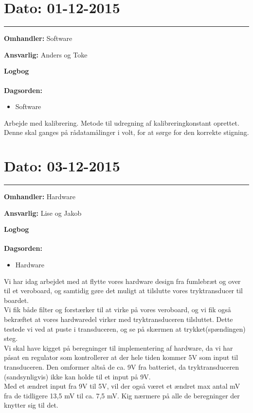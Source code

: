 	


\section{Dato: 01-12-2015 }
\hrule

\textbf{Omhandler:} Software

\textbf{Ansvarlig:} Anders og Toke

\textbf{Logbog}
\\
\\
\textbf{Dagsorden:}
\begin{itemize}
	\item Software
\end{itemize}

Arbejde med kalibrering. Metode til udregning af kalibreringkonstant oprettet. Denne skal ganges på rådatamålinger i volt, for at sørge for den korrekte stigning.
	
	
	
	
\section{Dato: 03-12-2015 }
\hrule

\textbf{Omhandler:} Hardware

\textbf{Ansvarlig:} Lise og Jakob

\textbf{Logbog}
\\
\\
\textbf{Dagsorden:}
\begin{itemize}
	\item Hardware
\end{itemize}

Vi har idag arbejdet med at flytte vores hardware design fra fumlebræt og over til et veroboard, og samtidig gøre det muligt at tilslutte vores tryktransducer til boardet.\\ 
Vi fik både filter og forstærker til at virke på vores veroboard, og vi fik også bekræftet at vores hardwaredel virker med tryktransduceren tilsluttet. Dette testede vi ved at puste i transduceren, og se på skærmen at trykket(spændingen) steg.	\\
Vi skal have kigget på beregninger til implementering af hardware, da vi har påsat en regulator som kontrollerer at der hele tiden kommer 5V som input til transduceren. Den omformer altså de ca. 9V fra batteriet, da tryktransduceren (sandsynligvis) ikke kan holde til et input på 9V.\\
Med et ændret input fra 9V til 5V, vil der også været et ændret max antal mV fra de tidligere 13,5 mV til ca. 7,5 mV. Kig nærmere på alle de beregninger der knytter sig til det.





